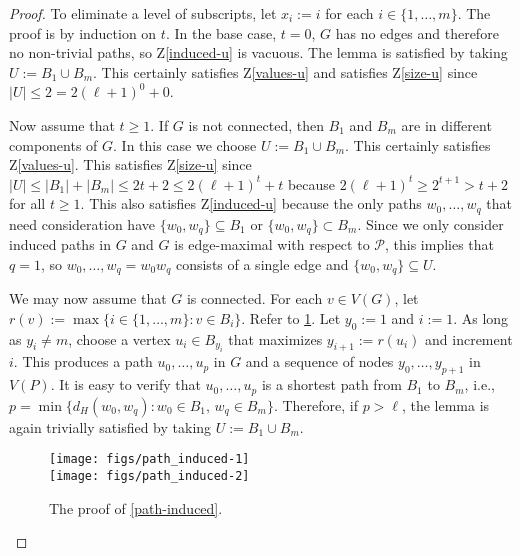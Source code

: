 \documentclass[kpfonts]{patmorin}
\newcommand{\defin}[1]{\emph{\color{brightmaroon}#1}}
\theoremstyle{named}
\begin{document}
\begin{proof}
    To eliminate a level of subscripts, let $x_i:=i$ for each $i\in\{1,\ldots,m\}$. The proof is by induction on $t$. In the base case, $t=0$, $G$ has no edges and therefore no non-trivial paths, so Z\ref{induced-u} is vacuous. The lemma is satisfied by taking $U:=B_{1}\cup B_{m}$.  This certainly satisfies Z\ref{values-u} and satisfies Z\ref{size-u} since $|U|\le 2= 2(\ell+1)^0+0$.

    Now assume that $t\ge 1$. If $G$ is not connected, then $B_{1}$ and $B_{m}$ are in different components of $G$.  In this case we choose $U:=B_{1}\cup B_{m}$. This certainly satisfies Z\ref{values-u}.  This satisfies Z\ref{size-u} since $|U|\le|B_1|+|B_m|\le 2t+2 \le 2(\ell+1)^t+t$ because $2(\ell+1)^t \ge 2^{t+1}> t+2$ for all $t\ge 1$.  This also satisfies Z\ref{induced-u} because the only paths $w_0,\ldots,w_q$ that need consideration have $\{w_0,w_q\}\subseteq B_1$ or $\{w_0,w_q\}\subset B_m$.  Since we only consider induced paths in $G$ and $G$ is edge-maximal with respect to $\mathcal{P}$, this implies that $q=1$, so $w_0,\ldots,w_q=w_0w_q$ consists of a single edge and $\{w_0,w_q\}\subseteq U$.

    We may now assume that $G$ is connected. For each $v\in V(G)$, let $r(v):=\max\{i\in\{1,\ldots,m\}:v\in B_i\}$.  Refer to \cref{induced_path_fig}.  Let $y_0:=1$ and $i:=1$.  As long as $y_i\neq m$, choose a vertex $u_i\in B_{y_i}$ that maximizes $y_{i+1}:=r(u_i)$ and increment $i$. This produces a path $u_0,\ldots,u_p$ in $G$ and a sequence of nodes $y_0,\ldots,y_{p+1}$ in $V(P)$.  It is easy to verify that $u_0,\ldots,u_p$ is a shortest path from $B_{1}$ to $B_{m}$, i.e., $p=\min\{d_H(w_0,w_q): w_0\in B_1,\, w_q\in B_m\}$.  Therefore, if $p>\ell$, the lemma is again trivially satisfied by taking $U:=B_{1}\cup B_{m}$.


    \begin{figure}
      \begin{center}
        \texttt{[image: figs/path\_induced-1]} \\
        \texttt{[image: figs/path\_induced-2]} \\
      \end{center}
      \caption{The proof of \cref{path-induced}.}
      \label{induced_path_fig}
    \end{figure}


\end{proof}
\end{document}
